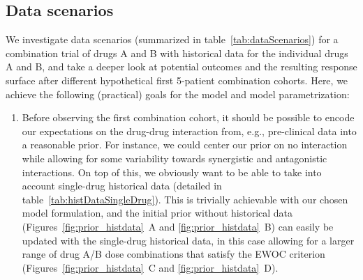 \documentclass[AMA,STIX1COL]{WileyNJD-v2}
\begin{document}
\subsection{Data scenarios}
We investigate data scenarios (summarized in table~\ref{tab:dataScenarios}) for a combination trial of drugs A and B with historical data for the individual drugs A and B, and take a deeper look at potential outcomes and the resulting response surface after different hypothetical first 5-patient combination cohorts. Here, we achieve the following (practical) goals for the model and model parametrization:


\begin{enumerate}
\item Before observing the first combination cohort, it should be possible to encode our expectations on the drug-drug interaction from, e.g., pre-clinical data into a reasonable prior. For instance, we could center our prior on no interaction while allowing for some variability towards synergistic and antagonistic interactions. On top of this, we obviously want to be able to take into account single-drug historical data (detailed in table~\ref{tab:histDataSingleDrug}). This is trivially achievable with our chosen model formulation, and the initial prior without historical data (Figures~\ref{fig:prior_histdata}~A and \ref{fig:prior_histdata}~B) can easily be updated with the single-drug historical data, in this case allowing for a larger range of drug A/B dose combinations that satisfy the EWOC criterion (Figures~\ref{fig:prior_histdata}~C and \ref{fig:prior_histdata}~D).





\end{enumerate}
\end{document}

